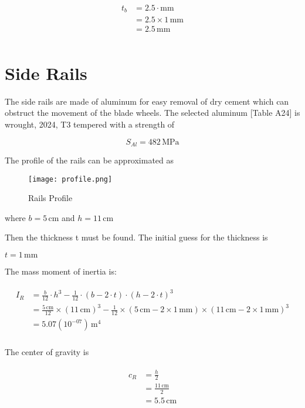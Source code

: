 \documentclass{article}
\begin{document}
\begin{align}
\begin{split}
t_{b}	&= 2.5 \cdot \mathrm{mm}\\
		&= 2.5 \times 1\,\mathrm{mm}\\
		&= 2.5\,\mathrm{mm}\\
\end{split}
\end{align}

\section{Side Rails}

The side rails are made of aluminum for easy removal of dry cement which can obstruct the movement of the blade wheels. The selected aluminum [Table A24] is wrought, 2024, T3 tempered with a strength of

\begin{equation}
S_{Al}	= 482\,\mathrm{MPa}
\end{equation}

The profile of the rails can be approximated as

\begin{figure}
	\centering
	\texttt{[image: profile.png]}
	\caption{Rails Profile}
	\label{first}
\end{figure}
where $b = 5\,\mathrm{cm}$ and $h = 11\,\mathrm{cm}$

Then the thickness t must be found. The initial guess for the thickness is

$t = 1\,\mathrm{mm}$

The mass moment of inertia is:

\begin{align}
\begin{split}
I_{R}	&= \frac{b}{12} \cdot h^{3} - \frac{1}{12} \cdot \left(b - 2 \cdot t\right) \cdot \left(h - 2 \cdot t\right)^{3}\\
		&= \frac{5\,\mathrm{cm}}{12} \times \left(11\,\mathrm{cm}\right)^{3} - \frac{1}{12} \times \left(5\,\mathrm{cm} - 2 \times 1\,\mathrm{mm}\right) \times \left(11\,\mathrm{cm} - 2 \times 1\,\mathrm{mm}\right)^{3}\\
		&= 5.07(10^{-07})\,\mathrm{m^{4}}\\
\end{split}
\end{align}

The center of gravity is

\begin{align}
\begin{split}
c_{R}	&= \frac{h}{2}\\
		&= \frac{11\,\mathrm{cm}}{2}\\
		&= 5.5\,\mathrm{cm}\\
\end{split}
\end{align}
\end{document}
